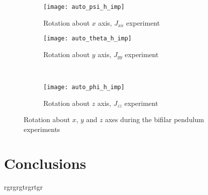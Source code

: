 \begin{figure}[H]
\begin{subfigure}{.5\linewidth}
\centering
\texttt{[image: auto\_psi\_h\_imp]}
\caption{Rotation about $x$ axis, $J_{xx}$ experiment}
\label{fig:auto_psi_h_imp}
\end{subfigure}%
\begin{subfigure}{.5\linewidth}
\centering
\texttt{[image: auto\_theta\_h\_imp]}
\caption{Rotation about $y$ axis, $J_{yy}$ experiment}
\label{fig:auto_theta_h_imp}
\end{subfigure}\\[1ex]
\begin{subfigure}{\linewidth}
\centering
\texttt{[image: auto\_phi\_h\_imp]}
\caption{Rotation about $z$ axis, $J_{zz}$ experiment}
\label{fig:auto_psi_h_imp}
\end{subfigure}
\caption{Rotation about $x$, $y$ and $z$ axes during the bifilar pendulum experiments}
\label{fig:auto_h_imp}
\end{figure}




\section{Conclusions}
rgrgrgtrgrtgr